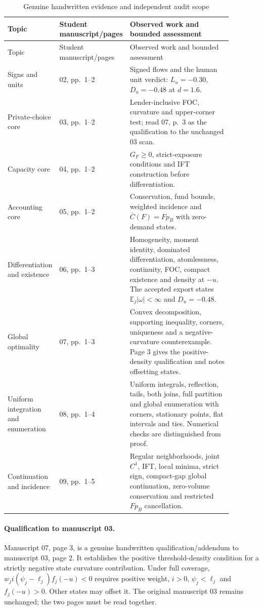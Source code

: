 \documentclass[11pt]{article}
\theoremstyle{definition}
\newcommand{\E}{\mathbb E}
\begin{document}
\begin{longtable}{P{0.20\linewidth}P{0.22\linewidth}P{0.46\linewidth}}
\caption{Genuine handwritten evidence and independent audit scope}\\
\toprule Topic & Student manuscript/pages & Observed work and bounded assessment\\ \midrule
\endfirsthead
\toprule Topic & Student manuscript/pages & Observed work and bounded assessment\\ \midrule
\endhead
Signs and units & 02, pp.~1--2 & Signed flows and the human unit verdict: $L_u=-0.30$, $D_u=-0.48$ at $d=1.6$.\\
Private-choice core & 03, pp.~1--2 & Lender-inclusive FOC, curvature and upper-corner test; read 07, p.~3 as the qualification to the unchanged 03 scan.\\
Capacity core & 04, pp.~1--2 & $G_F\ge0$, strict-exposure conditions and IFT construction before differentiation.\\
Accounting core & 05, pp.~1--2 & Conservation, fund bounds, weighted incidence and $\bar C(F)=Fp_B$ with zero-demand states.\\
Differentiation and existence & 06, pp.~1--3 & Homogeneity, moment identity, dominated differentiation, atomlessness, continuity, FOC, compact existence and density at $-u$. The accepted export states $\E_j|\omega|<\infty$ and $D_u=-0.48$.\\
Global optimality & 07, pp.~1--3 & Convex decomposition, supporting inequality, corners, uniqueness and a negative-curvature counterexample. Page 3 gives the positive-density qualification and notes offsetting states.\\
Uniform integration and enumeration & 08, pp.~1--4 & Uniform integrals, reflection, tails, both joins, full partition and global enumeration with corners, stationary points, flat intervals and ties. Numerical checks are distinguished from proof.\\
Continuation and incidence & 09, pp.~1--5 & Regular neighborhoods, joint $C^1$, IFT, local minima, strict sign, compact-gap global continuation, zero-volume conservation and restricted $Fp_B$ cancellation.\\
\bottomrule
\end{longtable}

\paragraph{Qualification to manuscript 03.}
Manuscript 07, page 3, is a genuine handwritten qualification/addendum to manuscript 03, page 2. It establishes the positive threshold-density condition for a strictly negative state curvature contribution. Under full coverage, $w_j i(\psi_j-\ell_j)f_j(-u)<0$ requires positive weight, $i>0$, $\psi_j<\ell_j$ and $f_j(-u)>0$. Other states may offset it. The original manuscript 03 remains unchanged; the two pages must be read together.
\end{document}
